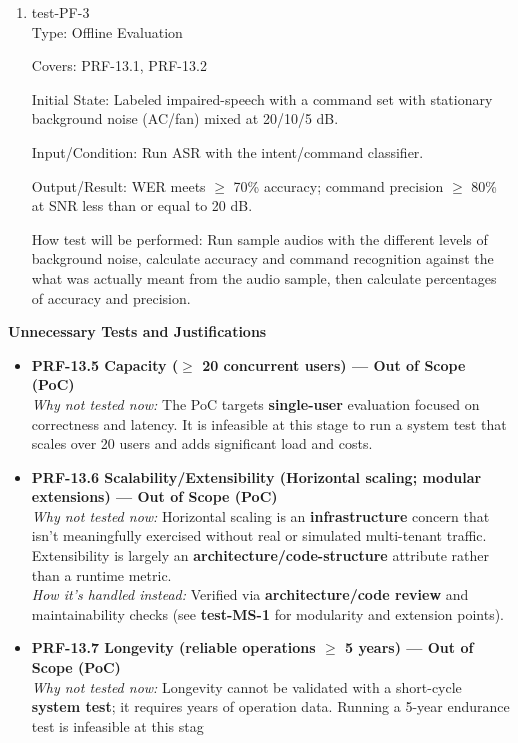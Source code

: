 \documentclass[12pt, titlepage]{article}
\begin{document}
\begin{enumerate}
\item{test-PF-3\\}
Type: Offline Evaluation

Covers: PRF-13.1, PRF-13.2

Initial State: Labeled impaired-speech with a command set with stationary background noise (AC/fan) mixed at 20/10/5 dB.

Input/Condition: Run ASR with the intent/command classifier.

Output/Result: WER meets $\geq$ 70\% accuracy; command precision $\geq$ 80\% at SNR less than or equal to 20 dB.

How test will be performed: Run sample audios with the different levels of background noise, calculate accuracy and command recognition against the what was actually meant from the audio sample, then calculate percentages of accuracy and precision.
\end{enumerate}

\noindent\textbf{Unnecessary Tests and Justifications}
\begin{itemize}
\item \textbf{PRF-13.5 Capacity ($\geq$ 20 concurrent users) — Out of Scope (PoC)}\\
\emph{Why not tested now:} The PoC targets \textbf{single-user} evaluation focused on correctness and latency. It is infeasible at this stage to run a system test that scales over 20 users and adds significant load and costs.
\item \textbf{PRF-13.6 Scalability/Extensibility (Horizontal scaling; modular extensions) — Out of Scope (PoC)}\\
\emph{Why not tested now:} Horizontal scaling is an \textbf{infrastructure} concern that isn’t meaningfully exercised without real or simulated multi-tenant traffic. Extensibility is largely an \textbf{architecture/code-structure} attribute rather than a runtime metric.\\
\emph{How it’s handled instead:} Verified via \textbf{architecture/code review} and maintainability checks (see \textbf{test-MS-1} for modularity and extension points).
\item \textbf{PRF-13.7 Longevity (reliable operations $\geq$ 5 years) — Out of Scope (PoC)}\\
\emph{Why not tested now:} Longevity cannot be validated with a short-cycle \textbf{system test}; it requires years of operation data. Running a 5-year endurance test is infeasible at this stag
\end{itemize}
\end{document}
